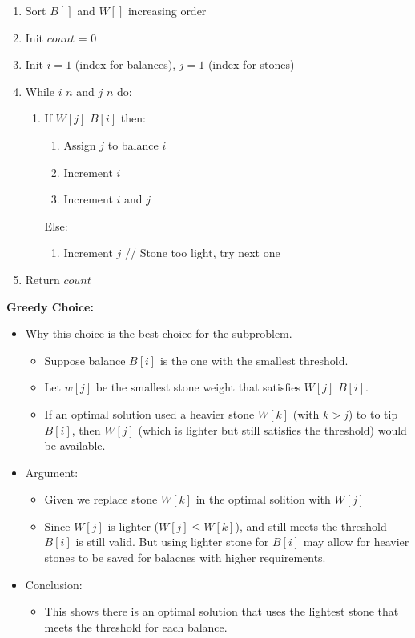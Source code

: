 \documentclass{article}[12pt]
\begin{document}
\begin{enumerate}
  \item Sort $B[]$ and $W[]$ increasing order
  \item Init $count$ = 0
  \item Init $i = 1$ (index for balances), $j = 1$ (index for stones)
  \item While $i$ \leq $n$ and $j$ \leq $n$ do:
    \begin{enumerate}
      \item If $W[j]$ \leq $B[i]$ then:
        \begin{enumerate}
          \item Assign $j$ to balance $i$
          \item Increment $i$
          \item Increment $i$ and $j$
        \end{enumerate}
        Else:
        \begin{enumerate}
          \item Increment $j$ // Stone too light, try next one
        \end{enumerate}
    \end{enumerate}
  \item Return $count$
\end{enumerate}
\noindent\textbf{Greedy Choice:} \\
\begin{itemize}
  \item Why this choice is the best choice for the subproblem.
    \begin{itemize}
      \item Suppose balance $B[i]$ is the one with the smallest threshold.
      \item Let $w[j]$ be the smallest stone weight 
        that satisfies $W[j]$ \geq $B[i]$.
      \item If an optimal solution used a heavier stone $W[k]$ (with $k>j$) to to tip
        $B[i]$, then $W[j]$ (which is lighter but still satisfies the threshold)
        would be available.
    \end{itemize}
  \item Argument:
    \begin{itemize}
      \item Given we replace stone $W[k]$ in the optimal solition with $W[j]$
      \item Since $W[j]$ is lighter ($W[j] \leq W[k]$), and still meets
        the threshold $B[i]$ is still valid. But using lighter stone for $B[i]$
        may allow for heavier stones to be saved for balacnes with higher requirements.
    \end{itemize}
  \item Conclusion:
    \begin{itemize}
      \item This shows there is an optimal solution that uses the lightest stone
        that meets the threshold for each balance.
    \end{itemize}
\end{itemize}
\end{document}

